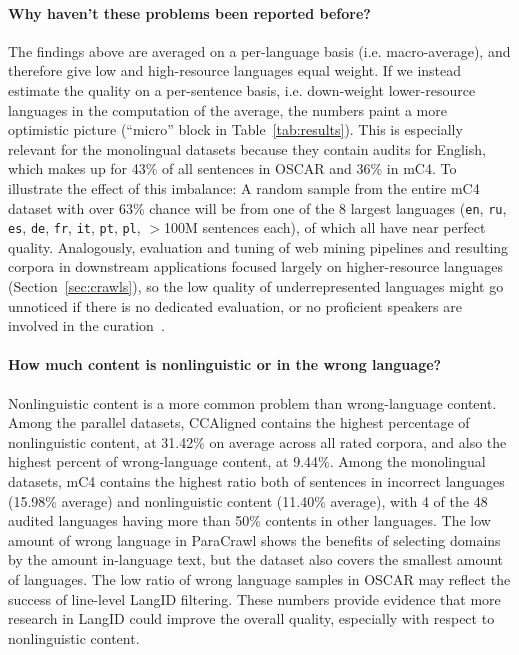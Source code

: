 \paragraph{Why haven't these problems been reported before?}
The findings above are averaged on a per-language basis (i.e. macro-average), and therefore give low and high-resource languages equal weight. If we instead estimate the quality on a per-sentence basis, i.e. down-weight lower-resource languages in the computation of the average, the numbers paint a more optimistic picture (``micro'' block in Table~\ref{tab:results}). This is especially relevant for the monolingual datasets because they contain audits for English, which makes up for 43\% of all sentences in OSCAR and 36\% in mC4. To illustrate the effect of this imbalance: A random sample from the entire mC4 dataset with over 63\% chance will be from one of the 8 largest languages (\texttt{en}, \texttt{ru}, \texttt{es}, \texttt{de}, \texttt{fr}, \texttt{it}, \texttt{pt}, \texttt{pl}, $>$100M sentences each), %
of which all have near perfect quality. Analogously, evaluation and tuning of web mining pipelines and resulting corpora in downstream applications focused largely on higher-resource languages (Section~\ref{sec:crawls}), so the low quality of underrepresented languages might go unnoticed if there is no dedicated evaluation, or no proficient speakers are involved in the curation~\citep{nekoto-etal-2020-participatory}.


\paragraph{How much content is nonlinguistic or in the wrong language?}
Nonlinguistic content is a more common problem than wrong-language content. Among the parallel datasets, CCAligned contains the highest percentage of nonlinguistic content, at 31.42\% on average across all rated corpora, and also the highest percent of wrong-language content, at 9.44\%. Among the monolingual datasets, mC4 contains the highest ratio both of sentences in incorrect languages (15.98\% average) and nonlinguistic content (11.40\% average), with 4 of the 48 audited languages having more than 50\% contents in other languages. The low amount of wrong language in ParaCrawl shows the benefits of selecting domains by the amount in-language text, but the dataset also covers the smallest amount of languages. The low ratio of wrong language samples in OSCAR may reflect the success of line-level LangID filtering.
These numbers provide evidence that more research in LangID could improve the overall quality, especially with respect to nonlinguistic content.

